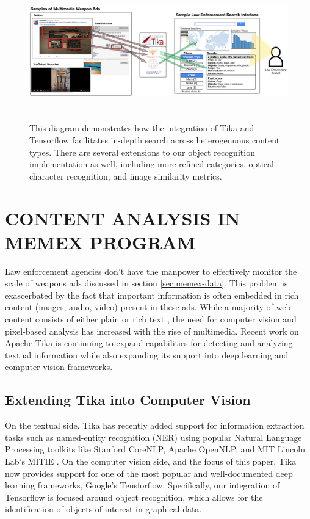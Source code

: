 \begin{figure}
	\includegraphics[width=\textwidth,height=6cm]{interface-diagram}
	\caption{This diagram demonstrates how the integration of Tika and Tensorflow facilitates in-depth search across heterogenuous content types. There are several extensions to our object recognition implementation as well, including more refined categories, optical-character recognition, and image similarity metrics.}
	\label{fig:interface-diagram}
\end{figure}

\section{CONTENT ANALYSIS IN MEMEX PROGRAM} \label{sec:memex}
Law enforcement agencies don't have the manpower to effectively monitor the scale of weapons ads discussed in section \ref{sec:memex-data}. This problem is exascerbated by the fact that important information is often embedded in rich content (images, audio, video) present in these ads. While a majority of web content consists of either plain or rich text \cite{mphillips-EOT2012}, the need for computer vision and pixel-based analysis has increased with the rise of multimedia. Recent work on Apache Tika is continuing to expand capabilities for detecting and analyzing textual information while also expanding its support into deep learning and computer vision frameworks. 

\subsection{Extending Tika into Computer Vision}

On the textual side, Tika has recently added support for information extraction tasks such as named-entity recognition (NER) using popular Natural Language Processing toolkits like Stanford CoreNLP\cite{Finkel:2005:INI:1219840.1219885}, Apache OpenNLP\cite{ApacheOpenNLP}, and MIT Lincoln Lab's MITIE \cite{MITIE-github}. On the computer vision side, and the focus of this paper, Tika now provides support for one of the most popular and well-documented deep learning frameworks, Google's Tensforflow. Specifically, our integration of Tensorflow is focused around object recognition, which allows for the identification of objects of interest in graphical data. 

